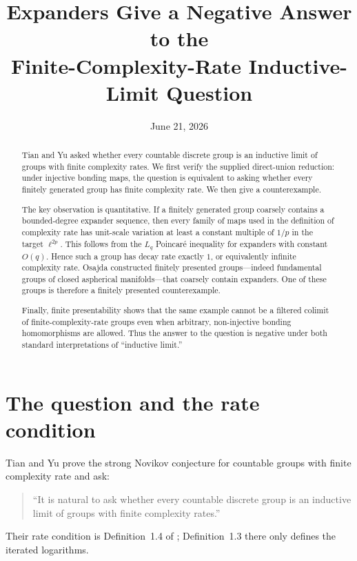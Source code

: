 \documentclass[11pt]{article}
\title{Expanders Give a Negative Answer to the\\
Finite-Complexity-Rate Inductive-Limit Question}
\author{}
\date{June 21, 2026}
\begin{document}
\maketitle

\begin{abstract}
Tian and Yu asked whether every countable discrete group is an inductive limit of groups with finite complexity rates.  We first verify the supplied direct-union reduction: under injective bonding maps, the question is equivalent to asking whether every finitely generated group has finite complexity rate.  We then give a counterexample.

The key observation is quantitative.  If a finitely generated group coarsely contains a bounded-degree expander sequence, then every family of maps used in the definition of complexity rate has unit-scale variation at least a constant multiple of $1/p$ in the target $\ell^{2p}$.  This follows from the $L_q$ Poincar\'e inequality for expanders with constant $O(q)$.  Hence such a group has decay rate exactly $1$, or equivalently infinite complexity rate.  Osajda constructed finitely presented groups---indeed fundamental groups of closed aspherical manifolds---that coarsely contain expanders.  One of these groups is therefore a finitely presented counterexample.

Finally, finite presentability shows that the same example cannot be a filtered colimit of finite-complexity-rate groups even when arbitrary, non-injective bonding homomorphisms are allowed.  Thus the answer to the question is negative under both standard interpretations of ``inductive limit.''
\end{abstract}

\section{The question and the rate condition}

Tian and Yu prove the strong Novikov conjecture for countable groups with finite complexity rate and ask:
\begin{quote}
``It is natural to ask whether every countable discrete group is an inductive limit of groups with finite complexity rates.''
\end{quote}
Their rate condition is Definition~1.4 of \cite{TianYu2026}; Definition~1.3 there only defines the iterated logarithms.
\end{document}
